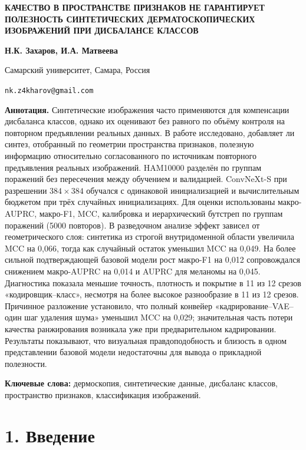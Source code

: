 \documentclass[12pt,a4paper]{article}
\begin{document}

\begin{center}
{\bfseries\large КАЧЕСТВО В ПРОСТРАНСТВЕ ПРИЗНАКОВ НЕ ГАРАНТИРУЕТ ПОЛЕЗНОСТЬ СИНТЕТИЧЕСКИХ ДЕРМАТОСКОПИЧЕСКИХ ИЗОБРАЖЕНИЙ ПРИ ДИСБАЛАНСЕ КЛАССОВ}\par
\vspace{0.7em}
{\bfseries Н.К. Захаров, И.А. Матвеева}\par
Самарский университет, Самара, Россия\par
\texttt{nk.z4kharov@gmail.com}
\end{center}

\noindent\textbf{Аннотация.}
Синтетические изображения часто применяются для компенсации дисбаланса классов, однако их оценивают без равного по объёму контроля на повторном предъявлении реальных данных. В работе исследовано, добавляет ли синтез, отобранный по геометрии пространства признаков, полезную информацию относительно согласованного по источникам повторного предъявления реальных изображений. HAM10000 разделён по группам поражений без пересечения между обучением и валидацией. ConvNeXt-S при разрешении $384\times384$ обучался с одинаковой инициализацией и вычислительным бюджетом при трёх случайных инициализациях. Для оценки использованы макро-AUPRC, макро-F1, MCC, калибровка и иерархический бутстреп по группам поражений (5000 повторов). В разведочном анализе эффект зависел от геометрического слоя: синтетика из строгой внутридоменной области увеличила MCC на 0,066, тогда как случайный остаток уменьшил MCC на 0,049. На более сильной подтверждающей базовой модели рост макро-F1 на 0,012 сопровождался снижением макро-AUPRC на 0,014 и AUPRC для меланомы на 0,045. Диагностика показала меньшие точность, плотность и покрытие в 11 из 12 срезов «кодировщик--класс», несмотря на более высокое разнообразие в 11 из 12 срезов. Причинное разложение установило, что полный конвейер «кадрирование--VAE--один шаг удаления шума» уменьшил MCC на 0,029; значительная часть потери качества ранжирования возникала уже при предварительном кадрировании. Результаты показывают, что визуальная правдоподобность и близость в одном представлении базовой модели недостаточны для вывода о прикладной полезности.

\noindent\textbf{Ключевые слова:} дермоскопия, синтетические данные, дисбаланс классов, пространство признаков, классификация изображений.

\section*{1. Введение}
\end{document}
